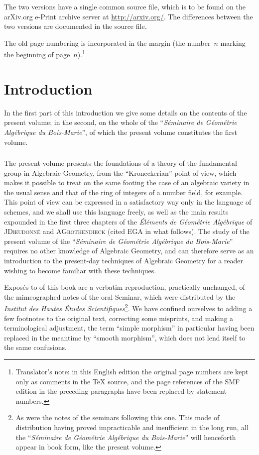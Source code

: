 The two versions have a single common source file, which is to be found
on the arXiv.org e-Print archive server at \url{http://arxiv.org/}. The
differences between the two versions are documented in the source file.

The old page numbering is incorporated in the margin (the number~$n$
marking the beginning of page~$n$).\footnote{Translator's note: in this
English edition the original page numbers are kept only as comments in
the \TeX{} source, and the page references of the SMF edition in the
preceding paragraphs have been replaced by statement numbers.}

\chapter*{Introduction}
\setcounter{section}{0}
\label{I.0}

In the first part of this introduction we give some details on the
contents of the present volume; in the second, on the whole of the
``\emph{S\'eminaire de G\'eom\'etrie Alg\'ebrique du Bois-Marie}'', of
which the present volume constitutes the first volume.

\subsection{}
\label{I.introduction.1}
The present volume presents the foundations of a theory of the
fundamental group in Algebraic Geometry, from the ``Kroneckerian'' point
of view, which makes it possible to treat on the same footing the case of
an algebraic variety in the usual sense and that of the ring of integers
of a number field, for example. This point of view can be expressed in a
satisfactory way only in the language of schemes, and we shall use this
language freely, as well as the main results expounded in the first
three chapters of the \emph{\'El\'ements de G\'eom\'etrie Alg\'ebrique}
of J\ptbl \textsc{Dieudonn\'e} and A\ptbl \textsc{Grothendieck} (cited
EGA in what follows). The study of the present volume of the
``\emph{S\'eminaire de G\'eom\'etrie Alg\'ebrique du Bois-Marie}''
requires no other knowledge of Algebraic Geometry, and can therefore
serve as an introduction to the present-day techniques of Algebraic
Geometry for a reader wishing to become familiar with these techniques.

Expos\'es  to  of this book are a verbatim reproduction,
practically unchanged, of the mimeographed notes of the oral Seminar,
which were distributed by the \emph{Institut des Hautes \'Etudes
Scientifiques}\footnote{As were the notes of the seminars following this
one. This mode of distribution having proved impracticable and
insufficient in the long run, all the ``\emph{S\'eminaire de
G\'eom\'etrie Alg\'ebrique du Bois-Marie}'' will henceforth appear in
book form, like the present volume.}. We have confined ourselves to
adding a few footnotes to the original text, correcting some misprints,
and making a terminological adjustment, the term ``simple morphism'' in
particular having been replaced in the meantime by ``smooth morphism'',
which does not lend itself to the same confusions.

